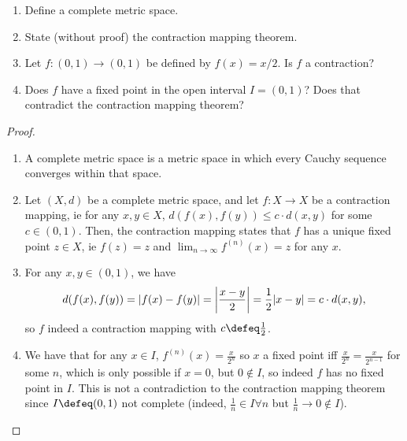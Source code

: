 \begin{question}
    \begin{enumerate}[label=(\alph*)]
        \item Define a complete metric space.
        \item State (without proof) the contraction mapping theorem.
        \item Let $f : (0, 1) \to (0, 1)$ be defined by $f(x) = x/2$. Is $f$ a contraction?
        \item Does $f$ have a fixed point in the open interval $I = (0, 1)$? Does that contradict the contraction mapping theorem?
    \end{enumerate}

\begin{proof}
    \begin{enumerate}[label=(\alph*)]
        \item A complete metric space is a metric space in which every Cauchy sequence converges within that space.
        \item Let $(X, d)$ be a complete metric space, and let $f : X \to X$ be a contraction mapping, ie for any $x, y \in X$, $d(f(x),f(y)) \leq c \cdot d(x, y)$ for some $c \in (0, 1)$. Then, the contraction mapping states that $f$ has a unique fixed point $z \in X$, ie $f(z) = z$ and $\lim_{n\to \infty} f^{(n)}(x) = z$ for any $x$.
        \item For any $x, y \in (0, 1)$, we have \[
        d(f(x), f(y)) = \abs{f(x) - f(y)} = \abs{\frac{x-y}{2}} = \frac{1}{2} \abs{x - y} = c \cdot d(x, y),
        \]
        so $f$ indeed a contraction mapping with $c \defeq \frac{1}{2}$.
        \item We have that for any $x \in I$, $f^{(n)}(x) = \frac{x}{2^n}$ so $x$ a fixed point iff $\frac{x}{2^n} = \frac{x}{2^{n-1}}$ for some $n$, which is only possible if $x = 0$, but $0 \notin I$, so indeed $f$ has no fixed point in $I$. This is not a contradiction to the contraction mapping theorem since $I \defeq (0, 1)$ not complete (indeed, $\frac{1}{n} \in I \forall n$ but $\frac{1}{n} \to 0 \notin I$).
    \end{enumerate}
\end{proof}

\end{question}

